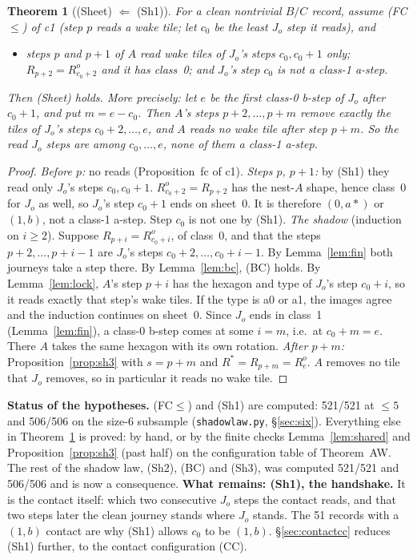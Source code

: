 \documentclass[11pt]{article}
\newtheorem{theorem}{Theorem}\newtheorem{lemma}[theorem]{Lemma}\newtheorem{proposition}[theorem]{Proposition}
\theoremstyle{definition}\newtheorem{definition}[theorem]{Definition}\newtheorem{remark}[theorem]{Remark}
\begin{document}
\begin{theorem}[(Sheet) $\Leftarrow$ (Sh1)]\label{thm:red}
For a clean nontrivial $B/C$ record, assume (FC$\le$) of c1 (step $p$ reads a wake tile; let $c_0$ be the least $J_o$ step it reads), and
\begin{itemize}
\item[\textbf{(Sh1)}] steps $p$ and $p+1$ of $A$ read wake tiles of $J_o$'s steps $c_0,c_0+1$ only; $R_{p+2}=R^o_{c_0+2}$ and it has class~0; and $J_o$'s step $c_0$ is not a class-1 a-step.
\end{itemize}
Then (Sheet) holds. More precisely: let $e$ be the first class-0 b-step of $J_o$ after $c_0+1$, and put $m=e-c_0$. Then $A$'s steps $p+2,\dots,p+m$ remove exactly the tiles of $J_o$'s steps $c_0+2,\dots,e$, and $A$ reads no wake tile after step $p+m$. So the read $J_o$ steps are among $c_0,\dots,e$, none of them a class-1 a-step.
\end{theorem}
\begin{proof}
\emph{Before $p$:} no reads (Proposition~fc of c1).
\emph{Steps $p$, $p+1$:} by (Sh1) they read only $J_o$'s steps $c_0,c_0+1$. $R^o_{c_0+2}=R_{p+2}$ has the nest-$A$ shape, hence class~0 for $J_o$ as well, so $J_o$'s step $c_0+1$ ends on sheet~0. It is therefore $(0,a\ast)$ or $(1,b)$, not a class-1 a-step. Step $c_0$ is not one by (Sh1).
\emph{The shadow} (induction on $i\ge2$). Suppose $R_{p+i}=R^o_{c_0+i}$, of class~0, and that the steps $p+2,\dots,p+i-1$ are $J_o$'s steps $c_0+2,\dots,c_0+i-1$. By Lemma~\ref{lem:fin} both journeys take a step there. By Lemma~\ref{lem:bc}, (BC) holds. By Lemma~\ref{lem:lock}, $A$'s step $p+i$ has the hexagon and type of $J_o$'s step $c_0+i$, so it reads exactly that step's wake tiles.
If the type is a0 or a1, the images agree and the induction continues on sheet~0. Since $J_o$ ends in class~1 (Lemma~\ref{lem:fin}), a class-0 b-step comes at some $i=m$, i.e.\ at $c_0+m=e$. There $A$ takes the same hexagon with its own rotation.
\emph{After $p+m$:} Proposition~\ref{prop:sh3} with $s=p+m$ and $R^\ast=R_{p+m}=R^o_e$. $A$ removes no tile that $J_o$ removes, so in particular it reads no wake tile.
\end{proof}
\noindent\textbf{Status of the hypotheses.} (FC$\le$) and (Sh1) are computed: 521/521 at $\le5$ and 506/506 on the size-6 subsample (\texttt{shadowlaw.py}, \S\ref{sec:six}). Everything else in Theorem~\ref{thm:red} is proved: by hand, or by the finite checks Lemma~\ref{lem:shared} and Proposition~\ref{prop:sh3} (past half) on the configuration table of Theorem~AW. The rest of the shadow law, (Sh2), (BC) and (Sh3), was computed 521/521 and 506/506 and is now a consequence.
\textbf{What remains: (Sh1), the handshake.} It is the contact itself: which two consecutive $J_o$ steps the contact reads, and that two steps later the clean journey stands where $J_o$ stands. The 51 records with a $(1,b)$ contact are why (Sh1) allows $c_0$ to be $(1,b)$. \S\ref{sec:contactcc} reduces (Sh1) further, to the contact configuration (CC).
\end{document}
